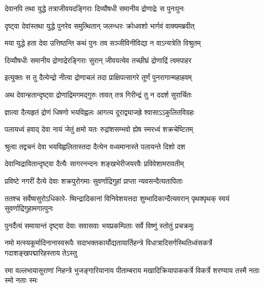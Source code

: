 \twolineshloka
{देवानपि तथा युद्धे तत्राजीवयदङ्गिराः}
{दिव्यौषधी समानीय द्रोणाद्रेः स पुनःपुनः} %

\twolineshloka
{दृष्ट्वा देवांस्तथा युद्धे पुनरेव समुत्थितान्}
{जलन्धरः क्रोधवशो भार्गवं वाक्यमब्रवीत्} %


\twolineshloka
{मया युद्धे हता देवा उत्तिष्ठन्ति कथं पुनः}
{तव सञ्जीविनीविद्या न वाऽन्यत्रेति विश्रुतम्} %


\twolineshloka
{दिव्यौषधीः समानीय द्रोणाद्रेरङ्गिराः सुरान्}
{जीवयत्येव तच्छीघ्रं द्रोणाद्रिं त्वमपाहर} %


\twolineshloka
{इत्युक्तः स तु दैत्येन्द्रो नीत्वा द्रोणाचलं तदा}
{प्राक्षिपत्सागरे तूर्णं पुनरागान्महाहवम्} %

\twolineshloka
{अथ देवान्हतान्दृष्ट्वा द्रोणाद्रिमगमद्गुरुः}
{तावत् तत्र गिरीन्द्रं तु न ददर्श सुरार्चितः} %

\twolineshloka
{ज्ञात्वा दैत्यहृतं द्रोणं धिषणो भयविह्वलः}
{आगत्य दूराद्व्याजह्रे श्वासाऽऽकुलितविग्रहः} %

\twolineshloka
{पलायध्वं हवाद् देवा नायं जेतुं क्षमो यतः}
{रुद्रांशसम्भवो ह्येष स्मरध्वं शक्रचेष्टितम्} %

\twolineshloka
{श्रुत्वा तद्वचनं देवा भयविह्वलितास्तदा}
{दैत्येन वध्यमानास्ते पलायन्ते दिशो दश} %

\twolineshloka
{देवान्विद्रावितान्दृष्ट्वा दैत्यैः सागरनन्दनः}
{शङ्खभेरीजयरवैः प्रविवेशामरावतीम्} %

\twolineshloka
{प्रविष्टे नगरीं दैत्ये देवाः शक्रपुरोगमाः}
{सुवर्णाद्रिगुहां प्राप्ता न्यवसन्दैत्यतापिताः} %

\fourlineindentedshloka
{ततश्च सर्वेष्वसुरोऽधिकारे-}
{ष्विन्द्रादिकानां विनिवेशयत्तदा}
{शुम्भादिकान्दैत्यवरान् पृथक्पृथक्}
{स्वयं सुवर्णाद्रिगुहामगात्पुनः} %





\twolineshloka
{पुनर्दैत्यं समायान्तं दृष्ट्वा देवाः सवासवाः}
{भयप्रकम्पिताः सर्वे विष्णुं स्तोतुं प्रचक्रमुः} %

\uvacha{[देवा ऊचुः]}

\fourlineindentedshloka
{नमो मत्स्यकूर्मादिनानास्वरूपैः}
{सदाभक्तकार्योद्यतायार्तिहन्त्रे}
{विधात्रादिसर्गस्थितिध्वंसकर्त्रे}
{गदाशङ्खपद्मारिहस्ताय तेऽस्तु} %

\fourlineindentedshloka
{रमा वल्लभायासुराणां निहन्त्रे}
{भुजङ्गारियानाय पीताम्बराय}
{मखादिक्रियापाककर्त्रे विकर्त्रे}
{शरण्याय तस्मै नताः स्मो नताः स्मः} %

